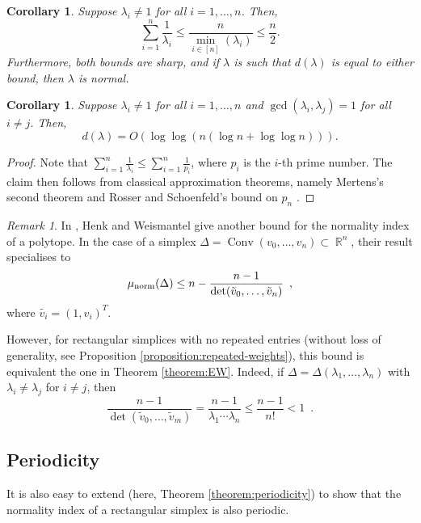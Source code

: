 \documentclass[a4paper,11pt]{amsart}
\theoremstyle{plain}
\newtheorem{corollary}[theorem]{Corollary}
\theoremstyle{definition}
\theoremstyle{remark}
\newtheorem{remark}[theorem]{Remark}
\DeclareMathOperator{\RR}{\mathbb{R}}
\DeclareMathOperator{\Conv}{Conv}
\DeclareMathOperator{\munorm}{\mu_{\text norm}}
\begin{document}
\begin{corollary}
    Suppose $\lambda_i \neq 1$ for all $i = 1, \ldots, n$. Then,
    \[
    \sum_{i = 1}^n \frac{1}{\lambda_i} \leq \frac{n}{\min_{i \in [n]}(\lambda_i)} \leq \frac{n}{2}.
    \]
    Furthermore, both bounds are sharp, and if $\lambda$ is such that $d(\lambda)$ is equal to either bound, then $\lambda$ is normal.
\end{corollary}

\begin{corollary}
    Suppose $\lambda_i \neq 1$ for all $i = 1, \ldots, n$ and $\gcd(\lambda_i, \lambda_j) = 1$ for all $i \neq j$. Then,
    \[
    d(\lambda) = O( \log\log \left ( n(\log n + \log\log n) \right )).
    \]
\end{corollary}

\begin{proof}
    Note that $\sum_{i = 1}^n \frac{1}{\lambda_i} \leq \sum_{i = 1}^n \frac{1}{p_i}$, where $p_i$ is the $i$-th prime number. The claim then follows from classical approximation theorems, namely Mertens's second theorem \cite[(2.4)]{RosserSchoenfeld:1962} and Rosser and Schoenfeld's bound on $p_n$ \cite[(2.20)]{RosserSchoenfeld:1962}.
\end{proof}

\begin{remark}
In \cite{HenkWeismantel:1997}, Henk and Weismantel give another bound for the normality index of a polytope. In the case of a simplex $\Delta = \Conv(v_0, \dots , v_n) \subset \RR^n$, their result specialises to 
\[\munorm(\Delta) \leq n - \frac{n-1}{\det(\tilde{v}_0, \dots , \tilde{v}_n)} \enspace,\]
where $\tilde{v_i} = (1,v_i)^T$.

However, for rectangular simplices with no repeated entries (without loss of generality, see Proposition \ref{proposition:repeated-weights}), this bound is equivalent the one in Theorem \ref{theorem:EW}. Indeed, if $\Delta = \Delta(\lambda_1, \dots , \lambda_n)$ with $\lambda_i \neq \lambda_j$ for $i \neq j$, then
\[\frac{n-1}{\det(\tilde{v}_0, \dots , \tilde{v}_m)} = \frac{n-1}{\lambda_1 \cdots \lambda_n} \leq \frac{n-1}{n!} < 1\enspace .\]
\end{remark}

\subsection{Periodicity}\label{subsection:periodicity} \hfill

It is also easy to extend \cite[Theorem 1.6]{BrunsGubeladze:1999} (here, Theorem \ref{theorem:periodicity}) to show that the normality index of a rectangular simplex is also periodic.
\end{document}
